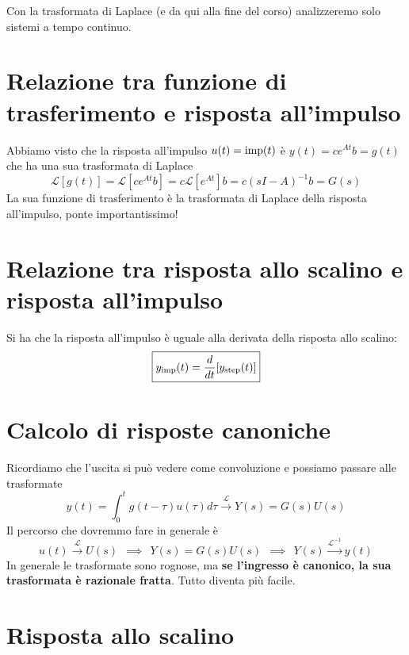 Con la trasformata di Laplace (e da qui alla fine del corso) analizzeremo solo sistemi a tempo continuo.

\section{Relazione tra funzione di trasferimento e risposta all'impulso}

Abbiamo visto che la risposta all'impulso $u(t) =\operatorname{imp}(t)$ è $y(t) =ce^{At} b=g(t)$ che ha una sua trasformata di Laplace
\begin{equation*}
	\mathcal{L}[ g(t)] =\mathcal{L}\left[ ce^{At} b\right] =c\mathcal{L}\left[ e^{At}\right] b=c(sI-A)^{-1} b=G(s)
\end{equation*}
La sua funzione di trasferimento è la trasformata di Laplace della risposta all'impulso, ponte importantissimo!

\section{Relazione tra risposta allo scalino e risposta all'impulso}

Si ha che la risposta all'impulso è uguale alla derivata della risposta allo scalino:
\begin{equation*}
	\boxed{y_{\operatorname{imp}}(t) =\frac{d}{dt}[ y_{\operatorname{step}}(t)]}
\end{equation*}

\section{Calcolo di risposte canoniche}

Ricordiamo che l'uscita si può vedere come convoluzione e possiamo passare alle trasformate
\begin{equation*}
	y(t) =\int ^t_0 g(t-\tau) u(\tau) d\tau \xrightarrow{\mathcal{L}}\boxed{Y(s) =G(s) U(s)}
\end{equation*}
Il percorso che dovremmo fare in generale è
\begin{equation*}
	u(t)\xrightarrow{\mathcal{L}} U(s) \ \ \implies \ \ Y(s) =G(s) U(s) \ \ \implies \ \ Y(s)\xrightarrow{\mathcal{L}^{-1}} y(t)
\end{equation*}
In generale le trasformate sono rognose, ma \textbf{se l'ingresso è canonico, la sua trasformata è razionale fratta}. Tutto diventa più facile.

\section{Risposta allo scalino}

